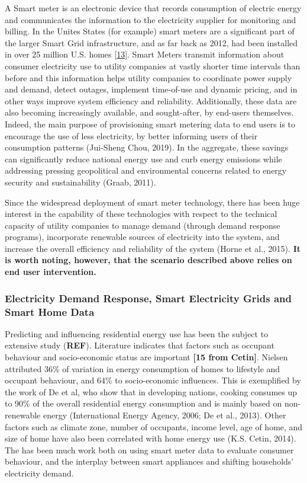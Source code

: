 \documentclass[11pt,]{article}
\begin{document}
A Smart meter is an electronic device that records consumption of
electric energy and communicates the information to the electricity
supplier for monitoring and billing. In the Unites States (for example)
smart meters are a significant part of the larger Smart Grid
infrastructure, and as far back as 2012, had been installed in over 25
million U.S. homes
{[}\protect\hyperlink{ref-hornePrivacyTechnologyNorms2015}{13}{]}. Smart
Meters transmit information about consumer electricity use to utility
companies at vastly shorter time intervals than before and this
information helps utility companies to coordinate power supply and
demand, detect outages, implement time-of-use and dynamic pricing, and
in other ways improve system efficiency and reliability. Additionally,
these data are also becoming increasingly available, and sought-after,
by end-users themselves. Indeed, the main purpose of provisioning smart
metering data to end users is to encourage the use of less electricity,
by better informing users of their consumption patterns (Jui-Sheng Chou,
2019). In the aggregate, these savings can significantly reduce national
energy use and curb energy emissions while addressing pressing
geopolitical and environmental concerns related to energy security and
sustainability (Graab, 2011).

Since the widespread deployment of smart meter technology, there has
been huge interest in the capability of these technologies with respect
to the technical capacity of utility companies to manage demand (through
demand response programs), incorporate renewable sources of electricity
into the system, and increase the overall efficiency and reliability of
the system (Horne et al., 2015). \textbf{It is worth noting, however,
that the scenario described above relies on end user intervention.}

\hypertarget{electricity-demand-response-smart-electricity-grids-and-smart-home-data}{%
\subsubsection{Electricity Demand Response, Smart Electricity Grids and
Smart Home
Data}\label{electricity-demand-response-smart-electricity-grids-and-smart-home-data}}

Predicting and influencing residential energy use has been the subject
to extensive study (\textbf{REF}). Literature indicates that factors
such as occupant behaviour and socio-economic status are important
\textbf{{[}15 from Cetin{]}}. Nielsen attributed 36\% of variation in
energy consumption of homes to lifestyle and occupant behaviour, and
64\% to socio-economic influences. This is exemplified by the work of De
et al, who show that in developing nations, cooking consumes up to 90\%
of the overall residential energy consumption and is mainly based on
non-renewable energy (International Energy Agency, 2006; De et al.,
2013). Other factors such as climate zone, number of occupants, income
level, age of home, and size of home have also been correlated with home
energy use (K.S. Cetin, 2014). The has been much work both on using
smart meter data to evaluate consumer behaviour, and the interplay
between smart appliances and shifting households' electricity demand.
\end{document}
